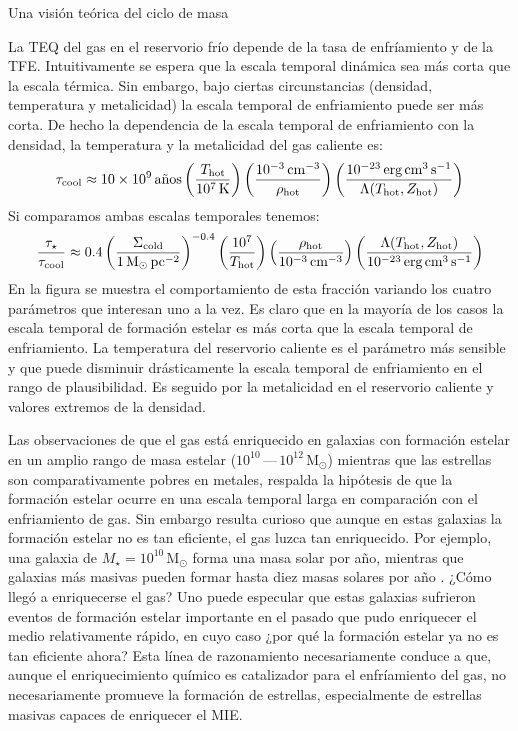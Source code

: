 \documentclass[xcolor=dvipsnames,4pt,hyperref={colorlinks,citecolor=black,linkcolor=black,urlcolor=black}]{beamer}
\begin{document}
\begin{frame}[allowframebreaks]{Una visión teórica del ciclo de masa}
\begin{description}
La TEQ del gas en el reservorio frío depende de la tasa de enfríamiento y de la TFE. Intuitivamente
se espera que la escala temporal dinámica sea más corta que la escala térmica. Sin embargo, bajo
ciertas circunstancias (densidad, temperatura y metalicidad) la escala temporal de enfriamiento
puede ser más corta.
De hecho la dependencia de la escala temporal de enfriamiento con la densidad, la temperatura y la
metalicidad del gas caliente es:
%
\begin{equation}
\tau_\text{cool}\approx10\times10^9\,\text{años}\left(\frac{T_\text{hot}}{10^7\,\text{K}}\right)\left(\frac{10^{-3}\,\text{cm}^{-3}}{\rho_\text{hot}}\right)\left(\frac{10^{-23}\,\text{erg\,cm}^{3}\,\text{s}^{-1}}{\Lambda(T_\text{hot},Z_\text{hot})}\right)
\end{equation}
%
Si comparamos ambas escalas temporales tenemos:
%
\begin{equation*}
\frac{\tau_\star}{\tau_\text{cool}} \approx 0.4\left(\frac{\Sigma_\text{cold}}{1\,\text{M}_\odot\,\text{pc}^{-2}}\right)^{-0.4}\left(\frac{10^7}{T_\text{hot}}\right)\left(\frac{\rho_\text{hot}}{10^{-3}\,\text{cm}^{-3}}\right)\left(\frac{\Lambda(T_\text{hot},Z_\text{hot})}{10^{-23}\,\text{erg\,cm}^{3}\,\text{s}^{-1}}\right)
\end{equation*}
%
En la figura se muestra el comportamiento de esta fracción variando los cuatro parámetros que
interesan uno a la vez. Es claro que en la mayoría de los casos la escala temporal de formación
estelar es más corta que la escala temporal de enfriamiento. La temperatura del reservorio caliente
es el parámetro más sensible y que puede disminuir drásticamente la escala temporal de enfriamiento
en el rango de plausibilidad. Es seguido por la metalicidad en el reservorio caliente y valores
extremos de la densidad.

Las observaciones de que el gas está enriquecido en galaxias con formación estelar en un amplio
rango de masa estelar ($10^{10}\,$---$\,10^{12}\,\text{M}_\odot$)
mientras que las estrellas son comparativamente pobres en metales, respalda la hipótesis de que la
formación estelar ocurre en una escala temporal larga en comparación con el enfriamiento de gas. Sin
embargo resulta curioso que aunque en estas galaxias la formación estelar no es tan eficiente, el
gas luzca tan enriquecido. Por ejemplo, una galaxia de $M_\star=10^{10}\,\text{M}_\odot$ forma una
masa solar por año, mientras que galaxias más masivas pueden formar hasta diez masas solares por año
\citep{Sanchez2013}. ¿Cómo llegó a enriquecerse el gas? Uno puede especular que estas galaxias
sufrieron eventos de formación estelar importante en el pasado que pudo enriquecer el medio
relativamente rápido, en cuyo caso ¿por qué la formación estelar ya no es tan eficiente ahora? Esta
línea de razonamiento necesariamente conduce a que, aunque el enriquecimiento químico es catalizador
para el enfríamiento del gas, no necesariamente promueve la formación de estrellas, especialmente de
estrellas masivas capaces de enriquecer el MIE.


\end{description}
\end{frame}
\end{document}
